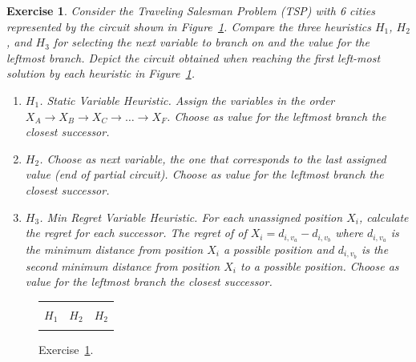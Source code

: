 \documentclass{article}
\newtheorem{exercise}{Exercise}[section]
\begin{document}
    \begin{exercise}
        Consider the Traveling Salesman Problem (TSP) with 6 cities represented by the circuit shown in Figure~\ref{fig:tsp_heuristic}.
        Compare the three heuristics $H_1$, $H_2$, and $H_3$ for selecting the next variable to branch on and the value for the leftmost branch.
        Depict the circuit obtained when reaching the first left-most solution by each heuristic in Figure~\ref{fig:tsp_heuristic}.
        \begin{enumerate}
            \item $H_1$. Static Variable Heuristic. Assign the variables in the order $X_A \rightarrow X_B \rightarrow X_C \rightarrow \ldots \rightarrow X_F $.
            Choose as value for the leftmost branch the closest successor.
            \item $H_2$. Choose as next variable, the one that corresponds to the last assigned value (end of partial circuit).
            Choose as value for the leftmost branch the closest successor.
            \item $H_3$. Min Regret Variable Heuristic. For each unassigned position $X_i$, calculate the \emph{regret} for each successor.
            The regret of of $X_i = d_{i,v_a} -d_{i,v_b}$ where $d_{i,v_a}$ is the minimum distance from position $X_i$ a possible position
            and $d_{i,v_b}$ is the second minimum distance from position $X_i$  to a possible position.
            Choose as value for the leftmost branch the closest successor.
        \end{enumerate}
        \label{ex:val_heuris2}
    \end{exercise}


    \begin{figure}[htbp]
        \centering
        \begin{tabular}{|c|c|c|}
            \hline \\
            $H_1$ & $H_2$ & $H_2$ \\
             &  &  \\ \hline
        \end{tabular}
        \label{fig:tsp_heuristic}
        \caption{Exercise~\ref{ex:val_heuris2}.}
    \end{figure}
\end{document}
